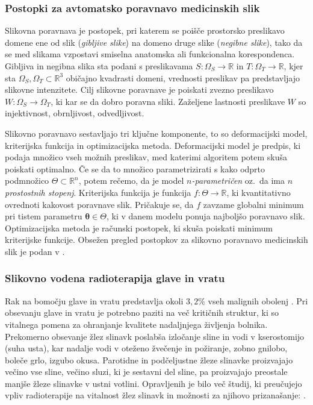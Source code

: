 \documentclass[a4paper,twoside,11pt]{article}
\begin{document}
	\subsubsection*{Postopki za avtomatsko poravnavo medicinskih slik}
	\par{
	  Slikovna poravnava je postopek, pri katerem se poišče prostorsko preslikavo domene ene od slik (\emph{gibljive slike}) na domeno druge slike (\emph{negibne slike}), tako da se med slikama vzpostavi smiselna anatomska ali funkcionalna korespondenca. Gibljiva in negibna slika sta podani s preslikavama $S\colon\Omega_S\rightarrow\mathbb{R}$ in $T\colon\Omega_T\rightarrow\mathbb{R}$, kjer sta $\Omega_S, \Omega_T\subset\mathbb{R}^3$ običajno kvadrasti domeni, vrednosti preslikav pa predstavljajo slikovne intenzitete. Cilj slikovne poravnave je poiskati zvezno preslikavo $W:\Omega_S\rightarrow\Omega_T$, ki kar se da dobro poravna sliki. Zaželjene lastnosti preslikave $W$ so injektivnost, obrnljivost, odvedljivost.
	}
	\par{
	  Slikovno poravnavo sestavljajo tri ključne komponente, to so deformacijski model, kriterijska funkcija in optimizacijska metoda. Deformacijski model je predpis, ki podaja množico vseh možnih preslikav, med katerimi algoritem potem skuša poiskati optimalno. Če se da to množico parametrizirati s kako odprto podmnožico $\Theta\subset\mathbb{R}^n$, potem rečemo, da je model \emph{$n$-parametričen} oz.~da ima \emph{$n$ prostostnih stopenj}. Kriterijska funkcija je funkcija $f\colon\Theta\rightarrow\mathbb{R}$, ki kvantitativno ovrednoti kakovost poravnave slik. Pričakuje se, da $f$ zavzame globalni minimum pri tistem parametru $\mathbf{\theta}\in\Theta$, ki v danem modelu ponuja najboljšo poravnavo slik. Optimizacijska metoda je računski postopek, ki skuša poiskati minimum kriterijske funkcije. Obsežen pregled postopkov za slikovno poravnavo medicinskih slik je podan v \cite{sotiras2013}.
	}
	\subsubsection*{Slikovno vodena radioterapija glave in vratu}
	\par{
	  Rak na bomočju glave in vratu predstavlja okoli $3,2\%$ vseh malignih obolenj \cite{jemal2010}. Pri obsevanju glave in vratu je potrebno paziti na več kritičnih struktur, ki so vitalnega pomena za ohranjanje kvalitete nadaljnjega življenja bolnika. Prekomerno obsevanje žlez slinavk poslabša izločanje sline in vodi v kserostomijo (suha usta), kar nadalje vodi v oteženo žvečenje in požiranje, zobno gnilobo, boleče grlo, izgubo okusa. Parotidne in podčeljustne žleze slinavke proizvajajo večino vse sline, večino sluzi, ki je sestavni del sline, pa proizvajajo preostale manjše žleze slinavke v ustni votlini. Opravljenih je bilo več študij, ki preučujejo vpliv radioterapije na vitalnost žlez slinavk in možnosti za njihovo prizanašanje: \cite{bhide2009,beetz2012,marzi2012,lee2014,yuan2014,vanluijk2015,tuomikoski2015,eisbruch2009}.
	}
	  
\end{document}
